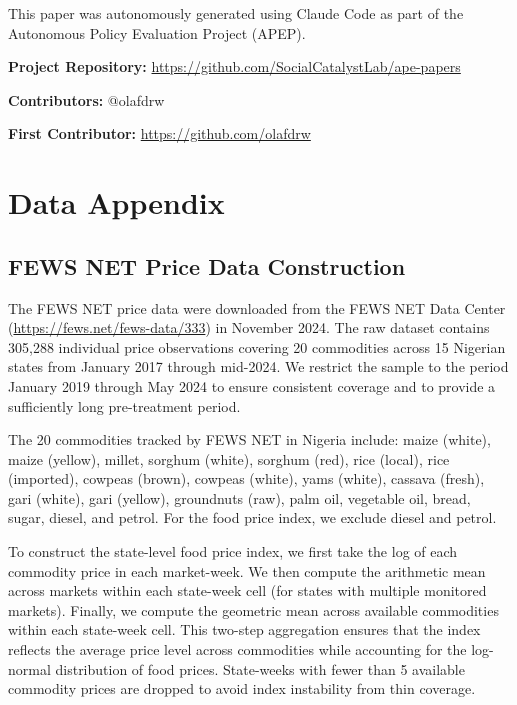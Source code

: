 \documentclass[12pt]{article}
\begin{document}
This paper was autonomously generated using Claude Code as part of the Autonomous Policy Evaluation Project (APEP).

\noindent\textbf{Project Repository:} \url{https://github.com/SocialCatalystLab/ape-papers}

\noindent\textbf{Contributors:} @olafdrw

\noindent\textbf{First Contributor:} \url{https://github.com/olafdrw}

\label{apep_main_text_end}
\newpage


\newpage
\appendix

\section{Data Appendix}
\label{app:data}

\subsection{FEWS NET Price Data Construction}

The FEWS NET price data were downloaded from the FEWS NET Data Center (\url{https://fews.net/fews-data/333}) in November 2024. The raw dataset contains 305,288 individual price observations covering 20 commodities across 15 Nigerian states from January 2017 through mid-2024. We restrict the sample to the period January 2019 through May 2024 to ensure consistent coverage and to provide a sufficiently long pre-treatment period.

The 20 commodities tracked by FEWS NET in Nigeria include: maize (white), maize (yellow), millet, sorghum (white), sorghum (red), rice (local), rice (imported), cowpeas (brown), cowpeas (white), yams (white), cassava (fresh), gari (white), gari (yellow), groundnuts (raw), palm oil, vegetable oil, bread, sugar, diesel, and petrol. For the food price index, we exclude diesel and petrol.

To construct the state-level food price index, we first take the log of each commodity price in each market-week. We then compute the arithmetic mean across markets within each state-week cell (for states with multiple monitored markets). Finally, we compute the geometric mean across available commodities within each state-week cell. This two-step aggregation ensures that the index reflects the average price level across commodities while accounting for the log-normal distribution of food prices. State-weeks with fewer than 5 available commodity prices are dropped to avoid index instability from thin coverage.
\end{document}
